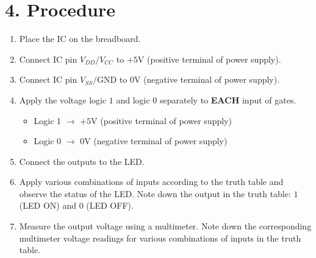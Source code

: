 \section*{4. Procedure}
\begin{enumerate}[leftmargin=*]
    \item Place the IC on the breadboard.
    \item Connect IC pin $V_{DD} / V_{CC}$ to $+5\text{V}$ (positive terminal of power supply).
    \item Connect IC pin $V_{SS} / \text{GND}$ to $0\text{V}$ (negative terminal of power supply).
    \item Apply the voltage logic $1$ and logic $0$ separately to \textbf{EACH} input of gates.
    \begin{itemize}
        \item Logic 1 $\rightarrow$ $+5\text{V}$ (positive terminal of power supply)
        \item Logic 0 $\rightarrow$ $0\text{V}$ (negative terminal of power supply)
    \end{itemize}
    \item Connect the outputs to the LED.
    \item Apply various combinations of inputs according to the truth table and observe the status of the LED. Note down the output in the truth table: $1$ (LED ON) and $0$ (LED OFF).
    \item Measure the output voltage using a multimeter. Note down the corresponding multimeter voltage readings for various combinations of inputs in the truth table.
\end{enumerate}

\newpage